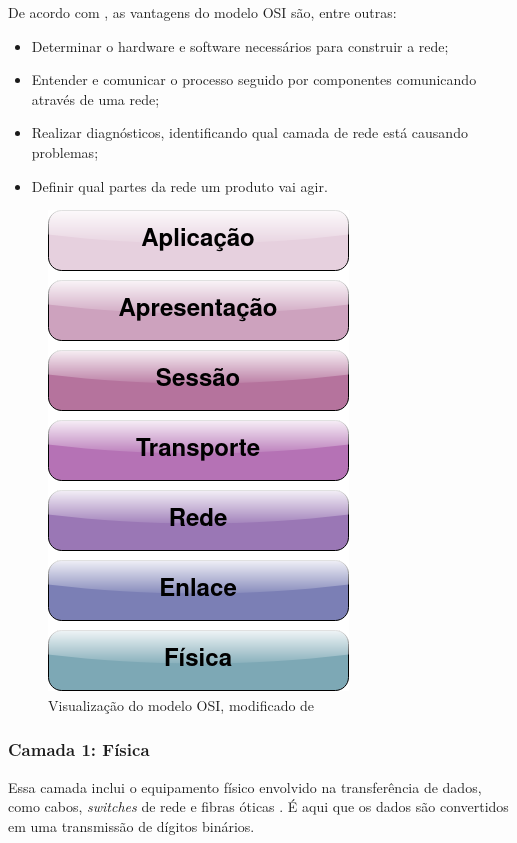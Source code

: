 \documentclass[tcc,capa]{texufpel}
\begin{document}
De acordo com \citet{imperva}, as vantagens do modelo OSI são, entre outras:
\begin{itemize}
    \item Determinar o hardware e software necessários para construir a rede;
    \item Entender e comunicar o processo seguido por componentes comunicando através de uma rede;
    \item Realizar diagnósticos, identificando qual camada de rede está causando problemas;
    \item Definir qual partes da rede um produto vai agir.
\end{itemize}

\begin{figure}[h]
    \centering
    \includegraphics[scale=0.4]{figs/osi.png}
    \medskip
    \caption{Visualização do modelo OSI, modificado de \cite{kurose}}
    \label{fig:osi}
\end{figure}

\subsubsection{Camada 1: Física}

Essa camada inclui o equipamento físico envolvido na transferência de dados, como cabos, \textit{switches} de rede e fibras óticas \cite{cloudflare_layers}. É aqui que os dados são convertidos em uma transmissão de dígitos binários.
\end{document}

